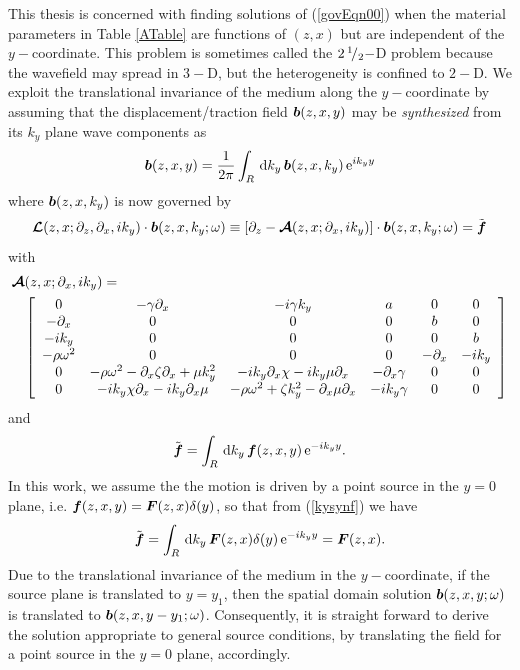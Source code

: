 This thesis is concerned with finding solutions of (\ref{govEqn00}) when 
the material parameters in Table \ref{ATable} are functions of $(z,x)$ but are 
independent of  the $y-$coordinate. This problem is sometimes called the 
$2 \hbox{$\,^1\!/_2$}-$D problem because the wavefield may spread in $3-$D, 
but the heterogeneity is confined to $2-$D.
We exploit the translational invariance of the medium along the 
$y-$coordinate by assuming that the displacement/traction field ${\mbox{\boldmath$\mit b$\unboldmath}}(z,x,y)$ may be {\em synthesized\/} from its  $k_y$ plane wave components as
\begin{equation} \label{kysyn}
{\mbox{\boldmath$\mit b$\unboldmath}}(z,x,y)={\frac{1}{2\pi }}\int_{R} \, {\rm d}{k}_{y}\,{\mbox{\boldmath$\mit b$\unboldmath}}(z,x,{k}_{y})\, {\rm e}^{i{k}_{y}y}
\end{equation}
where ${\mbox{\boldmath$\mit b$\unboldmath}}(z,x,{k}_{y})$ is now governed by
\begin{equation} \label{govEqn0} 
{\mbox{\boldmath$\cal L$\unboldmath}}(z,x;{\partial }_{z},{\partial }_{x},i {k}_{y})\cdot {\mbox{\boldmath$\mit b$\unboldmath} 
}(z,x,k_y; \omega)\equiv
\left[\partial_{z}-{\mbox{\boldmath$\cal A$\unboldmath}}(z,x;{\partial }_{x},i {k}_{y})\right]\cdot {\mbox{\boldmath$\mit b$\unboldmath} }(z,x,k_y; 
\omega)=
\tilde{\mbox{\boldmath$\mit f$\unboldmath}}
\end{equation}
with
\begin{eqnarray} \label{Adef}
\lefteqn{{\CB A}(z,x;{\partial }_{x},i {k}_{y})
=}\nonumber\\
&&\left[{\begin{array}{cccccc}
0&- \gamma {\partial }_{  x}&  -i \gamma {  k}_{  y}&  a&0&0\\ -{ \partial 
}_{x}&0&0&0&b&0\\ -i{k}_{y}&0&0&0&0&b\\ - \rho {\omega }^{  
2}&  0&0&0&-{ \partial }_{x}&-i{k}_{y}\\ 0&- \rho {\omega 
}^{  2}  -{ \partial }_{x} \zeta {\partial }_{  
x}  + \mu {  k}_{  y}^{  2}&  
-i{k}_{y}{ \partial }_{x} \chi   -i{k}_{y} \mu {\partial 
}_{  x}&  -{ \partial }_{x} \gamma &  0&0\\ 
0&-i{k}_{y} \chi {\partial }_{  x}  -i{k}_{y}{ \partial 
}_{x} \mu &  - \rho {\omega }^{  2}  + \zeta 
{  k}_{  y}^{  2}  -{ \partial }_{x} \mu 
{\partial }_{  x}&  -i{k}_{y} \gamma &  0&0\end{array}}\right]
\end{eqnarray}
and
\begin{equation} \label{kysynf}
\tilde{\mbox{\boldmath$\mit f$\unboldmath}}=\int_{R} \, {\rm d}{k}_{y}\,{\mbox{\boldmath$\mit f$\unboldmath}}(z,x,y)
\, {\rm e}^{-i{k}_{y}y}.
\end{equation}
In this work, we assume the the motion is driven by a point source in the 
$y=0$ plane, i.e. ${\mbox{\boldmath$\mit f$\unboldmath}}(z,x,y)= {\mbox{\boldmath$\mit F$\unboldmath}}(z,x) \delta(y)$, so that 
from (\ref{kysynf}) we have 
\begin{equation} \label{kysynf1}
\tilde{\mbox{\boldmath$\mit f$\unboldmath}}=\int_{R} \, {\rm d}{k}_{y}\,{\mbox{\boldmath$\mit F$\unboldmath}}(z,x) \delta(y)
\, {\rm e}^{-i{k}_{y}y} = {\mbox{\boldmath$\mit F$\unboldmath}}(z,x).
\end{equation}
Due to the translational invariance of the medium in the $y-$coordinate, 
if the source plane is translated to  $y=y_1$, then the spatial domain solution
${\mbox{\boldmath$\mit b$\unboldmath} }(z,x,y; \omega)$ is translated to  ${\mbox{\boldmath$\mit b$\unboldmath} }(z,x,y-y_1; 
\omega)$. Consequently, it is straight forward to derive the solution 
appropriate to general source conditions, by translating the field 
for a point source in the $y=0$ plane, accordingly.

